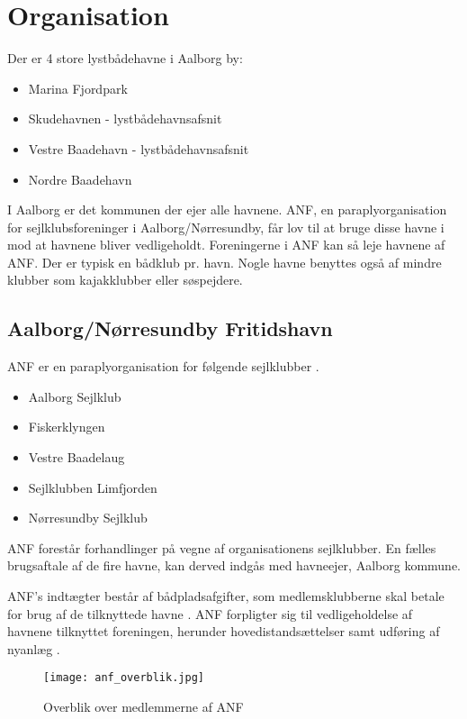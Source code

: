 \section{Organisation}

Der er 4 store lystbådehavne i Aalborg by:
\begin{itemize}
    \item Marina Fjordpark
    \item Skudehavnen - lystbådehavnsafsnit
    \item Vestre Baadehavn - lystbådehavnsafsnit
    \item Nordre Baadehavn
\end{itemize}

I Aalborg er det kommunen der ejer alle havnene. ANF, en paraplyorganisation for sejlklubsforeninger i Aalborg/Nørresundby, får lov til at bruge disse havne i mod at havnene bliver vedligeholdt. Foreningerne i ANF kan så leje havnene af ANF. Der er typisk en bådklub pr. havn. Nogle havne benyttes også af mindre klubber som kajakklubber eller søspejdere.

\subsection{Aalborg/Nørresundby Fritidshavn}

ANF er en paraplyorganisation for følgende sejlklubber \cite{anf_havnereglement}.
\begin{itemize}
	\item Aalborg Sejlklub
	\item Fiskerklyngen
	\item Vestre Baadelaug
	\item Sejlklubben Limfjorden
	\item Nørresundby Sejlklub
\end{itemize}
 
ANF forestår forhandlinger på vegne af organisationens sejlklubber. En fælles brugsaftale af de fire havne, kan derved indgås med havneejer, Aalborg kommune.

ANF's indtægter består af bådpladsafgifter, som medlemsklubberne skal betale for brug af de tilknyttede havne \cite{anf_budget_2013}. ANF forpligter sig til vedligeholdelse af havnene tilknyttet foreningen, herunder hovedistandsættelser samt udføring af nyanlæg \cite{anf_brugsaftale_2012}.

\begin{figure}
  \centering
  \texttt{[image: anf\_overblik.jpg]}
 	\caption{Overblik over medlemmerne af ANF}
 	\label{fig:anf_overblik}
\end{figure}


